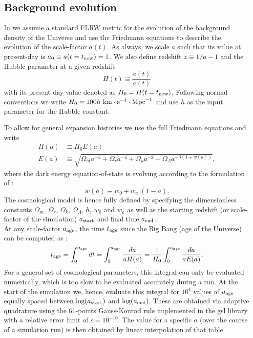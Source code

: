 \subsection{Background evolution}
\label{ssec:flrw}

In \swift we assume a standard FLRW metric for the evolution of the
background density of the Universe and use the Friedmann equations to
describe the evolution of the scale-factor $a(t)$.  As always, we
scale $a$ such that its value at present-day is $a_0 \equiv a(t=t_{\rm
  now}) = 1$. We also define redshift $z \equiv 1/a - 1$ and the
Hubble parameter at a given redshift
\begin{equation}
H(t) \equiv \frac{\dot{a}(t)}{a(t)}
\end{equation}
with its present-day value denoted as $H_0 = H(t=t_{\rm
  now})$. Following normal conventions we write $H_0 = 100
h~\rm{km}\cdot\rm{s}^{-1}\cdot\rm{Mpc}^{-1}$ and use $h$ as the input
parameter for the Hubble constant.

To allow for general expansion histories we use the full Friedmann
equations and write
\begin{align}
H(a) &\equiv H_0 E(a) \\ E(a) &\equiv\sqrt{\Omega_m a^{-3} + \Omega_r
  a^{-4} + \Omega_k a^{-2} + \Omega_\Lambda a^{-3(1+w(a))}},
\label{eq:friedmann}
\end{align}
where the dark energy equation-of-state is evolving according to the
formulation of \cite{Linder2003}:
\begin{equation}
w(a) \equiv w_0 + w_a~(1-a).
\end{equation}
The cosmological model is hence fully defined by specifying the
dimensionless constants $\Omega_m$, $\Omega_r$, $\Omega_k$,
$\Omega_\Lambda$, $h$, $w_0$ and $w_a$ as well as the starting
redshift (or scale-factor of the simulation) $a_{\rm start}$ and final
time $a_{\rm end}$. \\ At any scale-factor $a_{\rm age}$, the time
$t_{\rm age}$ since the Big Bang (age of the Universe) can be computed
as \citep[e.g.][]{Wright2006}:
\begin{equation}
  t_{\rm age} = \int_{0}^{a_{\rm age}} dt = \int_{0}^{a_{\rm age}}
  \frac{da}{a H(a)} = \frac{1}{H_0} \int_{0}^{a_{\rm age}}
  \frac{da}{a E(a)}.
\end{equation}
For a general set of cosmological parameters, this integral can only
be evaluated numerically, which is too slow to be evaluated accurately
during a run. At the start of the simulation we, hence, evaluate this
integral for $10^4$ values of $a_{\rm age}$ equally spaced between
$\log(a_{\rm start})$ and $\log(a_{\rm end})$. These are obtained via
adaptive quadrature using the 61-points Gauss-Konrod rule implemented
in the {\sc gsl} library \citep{GSL} with a relative error limit of
$\epsilon=10^{-10}$. The value for a specific $a$ (over the course of
a simulation run) is then obtained by linear interpolation of that
table.

